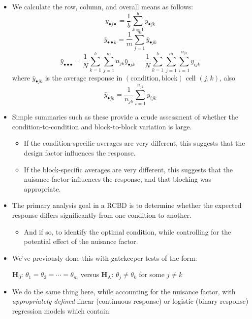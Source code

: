 \begin{itemize}
\begin{itemize}
            \end{itemize}
      \item We calculate the row, column, and overall means as follows:
            \[ \bar{y}_{\bullet j\bullet}=\frac{1}{b} \sum_{k=1}^{b} \bar{y}_{\bullet jk} \]
            \[ \bar{y}_{\bullet\bullet k}=\frac{1}{m} \sum_{j=1}^{m} \bar{y}_{\bullet jk} \]
            \[ \bar{y}_{\bullet\bullet\bullet}=\frac{1}{N} \sum_{k=1}^{b} \sum_{j=1}^{m} n_{jk}\bar{y}_{\bullet jk}=\frac{1}{N} \sum_{k=1}^{b} \sum_{j=1}^{m} \sum_{i=1}^{n_{jk}} y_{ijk} \]
            where $ \bar{y}_{\bullet jk} $ is the average response in $  (\text{condition}, \text{block}) $ cell $ (j, k) $, also
            \[ \bar{y}_{\bullet jk}=\frac{1}{n_{jk}} \sum_{i=1}^{n_{jk}} y_{ijk} \]
      \item Simple summaries such as these provide a crude assessment of whether the condition-to-condition and
            block-to-block variation is large.
            \begin{itemize}
                  \item If the condition-specific averages are very different, this suggests that the design factor influences the response.
                  \item If the block-specific averages are very different, this suggests that the nuisance factor influences the response, and that blocking was appropriate.
            \end{itemize}
      \item The primary analysis goal in a RCBD is to determine whether the expected response differs significantly
            from one condition to another.
            \begin{itemize}
                  \item And if so, to identify the optimal condition, while controlling for the potential effect of the nuisance factor.
            \end{itemize}
      \item We've previously done this with gatekeeper tests of the form:
            \begin{tightcenter}
                  $ \mathbf{H}_0 $: $ \theta_1=\theta_2=\cdots=\theta_m $ versus $ \mathbf{H}_\text{A} $: $ \theta_j\ne \theta_k $ for some $ j\ne k $
            \end{tightcenter}
      \item We do the same thing here, while accounting for the nuisance factor, with \emph{appropriately defined} linear (continuous response)
            or logistic (binary response) regression models which contain:

\end{itemize}
